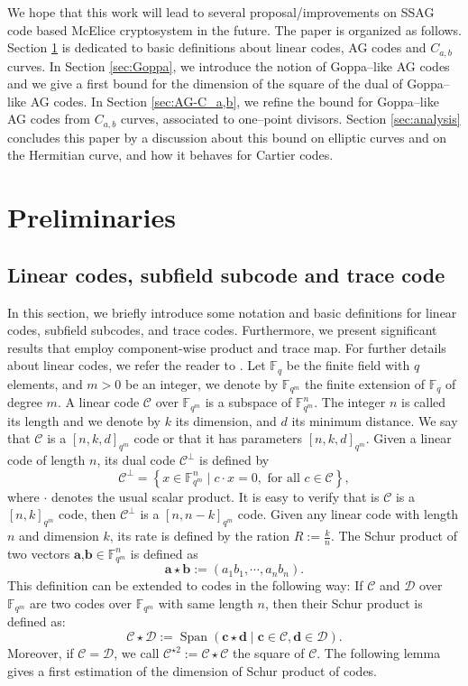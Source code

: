 \documentclass[a4paper]{article}
\theoremstyle{definition}
\theoremstyle{remark}
\newcommand{\calC}{\mathcal{C}}
\newcommand{\calD}{\mathcal{D}}
\newcommand{\fqm}{\mathbb{F}_{q^m}}
\newcommand{\fq}{\mathbb{F}_{q}}
\newcommand{\Span}[1]{\operatorname{Span}\left(#1\right)}
\newcommand\TODO[1]{\textcolor{red}{TO DO: #1}}
\begin{document}
We hope that this work will lead to several proposal/improvements on SSAG code based McElice cryptosystem in the future.
The paper is organized as follows. Section \ref{sec:preli} is dedicated to basic definitions about linear codes, AG codes and $C_{a,b}$ curves. In Section \ref{sec:Goppa}, we introduce the notion of Goppa--like AG codes and we give a first bound for the dimension of the square of the dual of Goppa--like AG codes. In Section \ref{sec:AG-C_a,b}, we refine the bound for Goppa--like AG codes from $C_{a,b}$ curves, associated to one--point divisors. Section \ref{sec:analysis} concludes this paper by a discussion about this bound on elliptic curves and on the Hermitian curve, and how it behaves for Cartier codes.

\section{Preliminaries}\label{sec:preli}
\subsection{Linear codes, subfield subcode and trace code}
In this section, we briefly introduce some notation and basic definitions for linear codes, subfield subcodes, and trace codes. Furthermore, we present significant results that employ component-wise product and trace map. For further details about linear codes, we refer the reader to \cite{MS86}.
\noindent Let $\fq$ be the finite field with $q$ elements, and $m > 0$ be an integer, we denote  by $\fqm$ the finite extension of $\fq$ of degree $m$. A linear code $\calC$ over $\fqm$ is a subspace of $\fqm^n$. The integer $n$ is called its length and we denote by $k$ its dimension, and $d$ its minimum distance. We say that $\calC$ is a $[n,k,d]_{q^m}$ code or that it has parameters $[n,k,d]_{q^m}$. Given a linear code of length $n$, its dual code $\calC^{\perp}$ is defined by 
\[\calC^{\perp}=\left\lbrace x \in \fqm^n \mid c \cdot x=0, \text{ for all } c \in \calC \right\rbrace,\]  
where $\cdot$ denotes the usual scalar product. It is easy to verify that is $\calC$ is a $[n,k]_{q^m}$ code, then $\calC^{\perp}$ is a $[n,n-k]_{q^m}$ code.
Given any linear code with length $n$ and dimension $k$, its rate is defined by the ration $R := \frac{k}{n}$.
\noindent The Schur product of two vectors $\mathbf{a}$,$\mathbf{b} \in \fqm^n$ is defined as 
\[ \mathbf{a} \star \mathbf{b} := (a_1b_1,\cdots,a_nb_n). \]
This definition can be extended to codes in the following way: If $\calC$ and $\calD$ over $\fqm$ are two codes over $\fqm$ with same length $n$, then their Schur product is defined as:
\[ \calC \star \calD := \Span{\mathbf{c} \star \mathbf{d} \mid \mathbf{c} \in \calC, \mathbf{d} \in \calD}. \]
Moreover, if $\calC = \calD$, we call $\calC^{\star 2} := \calC \star \calC$ the square of $\calC$. The following lemma gives a first estimation of the dimension of Schur product of codes.
\end{document}
